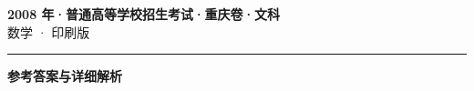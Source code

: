 \documentclass[zihao=5, a4paper]{ctexart}
\begin{document}
\begin{center}
  {\Large\bfseries 2008 年·普通高等学校招生考试·重庆卷·文科}\\[4pt]
  {\large 数学 · 印刷版}
\end{center}
\medskip
{}

\par\bigskip\hrule\bigskip
{}
\begin{center}{\large\bfseries 参考答案与详细解析}\end{center}
\smallskip

\end{document}
